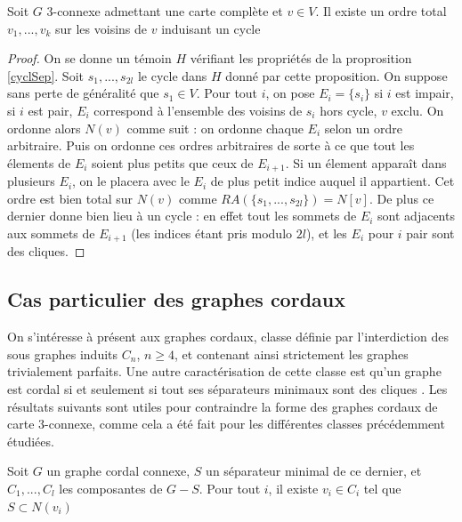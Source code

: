 \documentclass{scrartcl}
\begin{document}
\begin{flushleft}
\begin{cor}\label{ordCycl}
    Soit $G$ $3$-connexe admettant une carte complète et $v \in V$. Il existe un ordre total $v_1, ..., v_k$ sur les voisins de $v$
    induisant un cycle
\end{cor}

\begin{proof}
    On se donne un témoin $H$ vérifiant les propriétés de la proprosition \ref{cyclSep}. Soit $s_1, ..., s_{2l}$ le cycle dans $H$
    donné par cette proposition. On suppose sans perte de généralité que $s_1 \in V$. Pour tout $i$, on pose $E_i = \{s_i\}$
    si $i$ est impair, si $i$ est pair, $E_i$ correspond à l'ensemble des voisins de $s_i$ hors cycle, $v$ exclu. On ordonne alors $N(v)$
    comme suit : on ordonne chaque $E_i$ selon un ordre arbitraire. Puis on ordonne ces ordres arbitraires de sorte à ce que
    tout les élements de $E_i$ soient plus petits que ceux de $E_{i+1}$. Si un élement apparaît dans plusieurs $E_i$, on le placera avec
    le $E_i$ de plus petit indice auquel il appartient. Cet ordre est bien total sur $N(v)$
    comme $RA(\{s_1, ..., s_{2l}\}) = N[v]$. De plus ce dernier donne bien lieu à un cycle : en effet tout les sommets de $E_i$ sont
    adjacents aux sommets de $E_{i+1}$ (les indices étant pris modulo $2l$), et les $E_i$ pour $i$ pair sont des cliques.
\end{proof}

\subsection{Cas particulier des graphes cordaux}

On s'intéresse à présent aux graphes cordaux, classe définie par l'interdiction des sous graphes induits $C_n$, $n \geq 4$, et contenant
ainsi strictement les graphes trivialement parfaits. Une autre caractérisation de cette classe est qu'un graphe est cordal si et seulement si
tout ses séparateurs minimaux sont des cliques \cite{cordSep}. Les résultats suivants sont utiles pour contraindre la forme des graphes cordaux
de carte $3$-connexe, comme cela a été fait pour les différentes classes précédemment étudiées.

\begin{lem}\label{cordsepintercliquemax}
    Soit $G$ un graphe cordal connexe, $S$ un séparateur minimal de ce dernier, et $C_1, ..., C_l$ les composantes de $G - S$. Pour tout
    $i$, il existe $v_i \in C_i$ tel que $S \subset N(v_i)$
\end{lem}


\end{flushleft}
\end{document}
